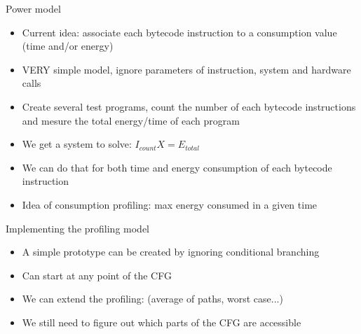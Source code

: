 \documentclass{beamer}
\begin{document}
\begin{frame}{Power model}
\begin{itemize}
    \item Current idea: associate each bytecode instruction to a consumption value (time and/or energy)
    \pause  
    \item VERY simple model, ignore parameters of instruction, system and hardware calls
    \pause 
    \item Create several test programs, count the number of each bytecode instructions and mesure the total energy/time of each program
    \pause
    \item We get a system to solve: $I_{count} X = E_{total}$
    \pause
    \item We can do that for both time and energy consumption of each bytecode instruction
    \pause 
    \item Idea of consumption profiling: max energy consumed in a given time
\end{itemize}
    
\end{frame}

\begin{frame}{Implementing the profiling model}
\begin{itemize}
    \item A simple prototype can be created by ignoring conditional branching
    \pause
    \item Can start at any point of the CFG
    \pause 
    \item We can extend the profiling: (average of paths, worst case...)
    \pause 
    \item We still need to figure out which parts of the CFG are accessible
\end{itemize}
    
\end{frame}
\end{document}
